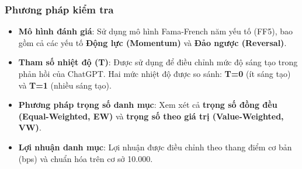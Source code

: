 \documentclass[a4paper,12pt]{article}
\begin{document}
\subsubsection{Phương pháp kiểm tra}
\begin{itemize}
    \item \textbf{Mô hình đánh giá}: Sử dụng mô hình Fama-French năm yếu tố (FF5), bao gồm cả các yếu tố \textbf{Động lực (Momentum)} và \textbf{Đảo ngược (Reversal)}.
    \item \textbf{Tham số nhiệt độ (T)}: Được sử dụng để điều chỉnh mức độ sáng tạo trong phản hồi của ChatGPT. Hai mức nhiệt độ được so sánh: \textbf{T=0} (ít sáng tạo) và \textbf{T=1} (nhiều sáng tạo).
    \item \textbf{Phương pháp trọng số danh mục}: Xem xét cả \textbf{trọng số đồng đều (Equal-Weighted, EW)} và \textbf{trọng số theo giá trị (Value-Weighted, VW)}.
    \item \textbf{Lợi nhuận danh mục}: Lợi nhuận được điều chỉnh theo thang điểm cơ bản (bps) và chuẩn hóa trên cơ sở 10.000.
\end{itemize}
\end{document}
